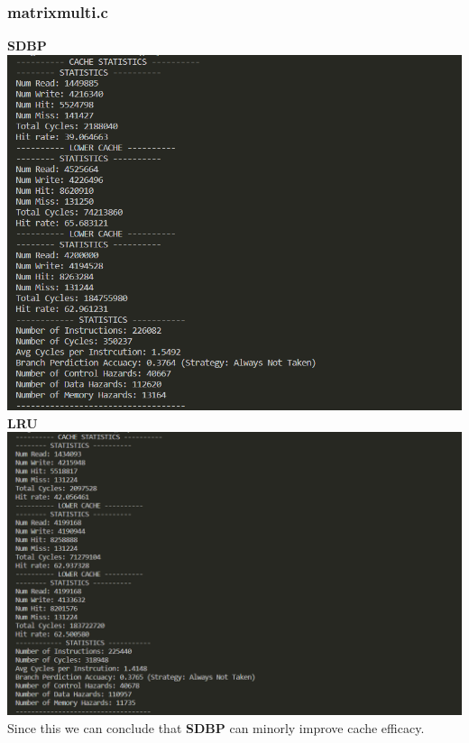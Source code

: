 \documentclass{article}
\begin{document}
\subsubsection{matrixmulti.c}
\textbf{SDBP}\\
\includegraphics[scale = 0.25]{LDBP matr.png}\\
\textbf{LRU}\\
\includegraphics[scale = 0.25]{LRU matrix.png}\\

Since this we can conclude that \textbf{SDBP} can minorly improve cache efficacy.
\end{document}
